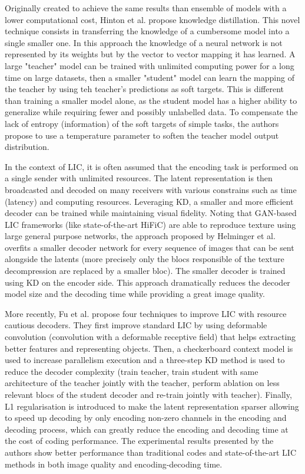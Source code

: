 \documentclass{article}
\begin{document}
Originally created to achieve the same results than ensemble of models with a lower computational cost, Hinton et al. \cite{hinton2015distillingknowledgeneuralnetwork} propose knowledge distillation. This novel technique consists in transferring the knowledge of a cumbersome model into a single smaller one. In this approach the knowledge of a neural network is not represented by its weights but by the vector to vector mapping it has learned. A large "teacher" model can be trained with unlimited computing power for a long time on large datasets, then a smaller "student" model can learn the mapping of the teacher by using teh teacher's predictions as soft targets. This is different than training a smaller model alone, as the student model has a higher ability to generalize while requiring fewer and possibly unlabelled data. To compensate the lack of entropy (information) of the soft targets of simple tasks, the authors propose to use a temperature parameter to soften the teacher model output distribution.

In the context of LIC, it is often assumed that the encoding task is performed on a single sender with unlimited resources. The latent representation is then broadcasted and decoded on many receivers with various constrains such as time (latency) and computing resources. Leveraging KD, a smaller and more efficient decoder can be trained while maintaining visual fidelity. Noting that GAN-based LIC frameworks (like state-of-the-art HiFiC) are able to reproduce texture using large general purpose networks, the approach proposed by Helminger et al. \cite{helminger2022microdosingknowledgedistillationgan} overfits a smaller decoder network for every sequence of images that can be sent alongside the latents (more precisely only the blocs responsible of the texture decompression are replaced by a smaller bloc). The smaller decoder is trained using KD on the encoder side. This approach dramatically reduces the decoder model size and the decoding time while providing a great image quality.

More recently, Fu et al. \cite{fu2023fasthighperformancelearnedimage} propose four techniques to improve LIC with resource cautious decoders. They first improve standard LIC by using deformable convolution (convolution with a deformable receptive field) that helps extracting better features and representing objects. Then, a checkerboard context model is used to increase parallelism execution and a three-step KD method is used to reduce the decoder complexity (train teacher, train student with same architecture of the teacher jointly with the teacher, perform ablation on less relevant blocs of the student decoder and re-train jointly with teacher). Finally, L1 regularisation is introduced to make the latent representation sparser allowing to speed up decoding by only encoding non-zero channels in the encoding and decoding process, which can greatly reduce the encoding and decoding time at the cost of coding performance. The experimental results presented by the authors show better performance than traditional codes and state-of-the-art LIC methods in both image quality and encoding-decoding time.
\end{document}
